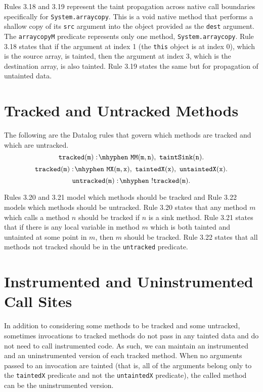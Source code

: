 Rules 3.18 and 3.19 represent the taint propagation across native call
boundaries specifically for \texttt{System.arraycopy}. This is a void
native method that performs a shallow copy of its \texttt{src}
argument into the object provided as the \texttt{dest} argument. The
\texttt{arraycopyM} predicate represents only one method,
\texttt{System.arraycopy}. Rule 3.18 states that if the argument at
index 1 (the \texttt{this} object is at index 0), which is the source
array, is tainted, then the argument at index 3, which is the
destination array, is also tainted. Rule 3.19 states the same but for
propagation of untainted data.
\section{Tracked and Untracked Methods}
The following are the Datalog rules that govern which methods are
tracked and which are untracked.
\begin{equation}
  \mathtt{tracked(m) \is MM(m,n) \also taintSink(n).}
\end{equation}
\begin{equation}
  \mathtt{tracked(m) \is MX(m,x) \also taintedX(x) \also
    untaintedX(x).}
\end{equation}
\begin{equation}
  \mathtt{untracked(m) \is !tracked(m).}
\end{equation}


Rules 3.20 and 3.21 model which methods should be tracked and Rule
3.22 models which methods should be untracked. Rule 3.20 states that
any method $m$ which calls a method $n$ should be tracked if $n$ is a
sink method. Rule 3.21 states that if there is any local variable in
method $m$ which is both tainted and untainted at some point in $m$,
then $m$ should be tracked. Rule 3.22 states that all methods not
tracked should be in the \texttt{untracked} predicate.
\section{Instrumented and Uninstrumented Call Sites}
In addition to considering some methods to be tracked and some
untracked, sometimes invocations to tracked methods do not pass in any
tainted data and do not need to call instrumented code. As such, we
can maintain an instrumented and an uninstrumented version of each
tracked method. When no arguments passed to an invocation are tainted
(that is, all of the arguments belong only to the \texttt{taintedX}
predicate and not the \texttt{untaintedX} predicate), the called
method can be the uninstrumented version.

